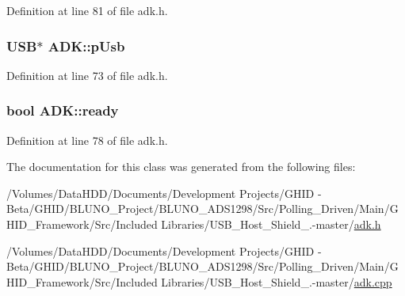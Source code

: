 \-Definition at line 81 of file adk.\-h.

\hypertarget{class_a_d_k_ab28e3a19569c27f3ed5362e9800065c1}{
\subsubsection[{p\-Usb}]{\setlength{\rightskip}{0pt plus 5cm}\-U\-S\-B$\ast$ {\bf \-A\-D\-K\-::p\-Usb}}}\label{class_a_d_k_ab28e3a19569c27f3ed5362e9800065c1}


\-Definition at line 73 of file adk.\-h.

\hypertarget{class_a_d_k_a135db75b9e8cdd59b89f46c44dd83dd4}{
\subsubsection[{ready}]{\setlength{\rightskip}{0pt plus 5cm}bool {\bf \-A\-D\-K\-::ready}}}\label{class_a_d_k_a135db75b9e8cdd59b89f46c44dd83dd4}


\-Definition at line 78 of file adk.\-h.



\-The documentation for this class was generated from the following files\-:\begin{DoxyCompactItemize}
\item 
/\-Volumes/\-Data\-H\-D\-D/\-Documents/\-Development Projects/\-G\-H\-I\-D -\/ Beta/\-G\-H\-I\-D/\-B\-L\-U\-N\-O\-\_\-\-Project/\-B\-L\-U\-N\-O\-\_\-\-A\-D\-S1298/\-Src/\-Polling\-\_\-\-Driven/\-Main/\-G\-H\-I\-D\-\_\-\-Framework/\-Src/\-Included Libraries/\-U\-S\-B\-\_\-\-Host\-\_\-\-Shield\-\_.-\/master/\hyperlink{adk_8h}{adk.\-h}\item 
/\-Volumes/\-Data\-H\-D\-D/\-Documents/\-Development Projects/\-G\-H\-I\-D -\/ Beta/\-G\-H\-I\-D/\-B\-L\-U\-N\-O\-\_\-\-Project/\-B\-L\-U\-N\-O\-\_\-\-A\-D\-S1298/\-Src/\-Polling\-\_\-\-Driven/\-Main/\-G\-H\-I\-D\-\_\-\-Framework/\-Src/\-Included Libraries/\-U\-S\-B\-\_\-\-Host\-\_\-\-Shield\-\_.-\/master/\hyperlink{adk_8cpp}{adk.\-cpp}\end{DoxyCompactItemize}
